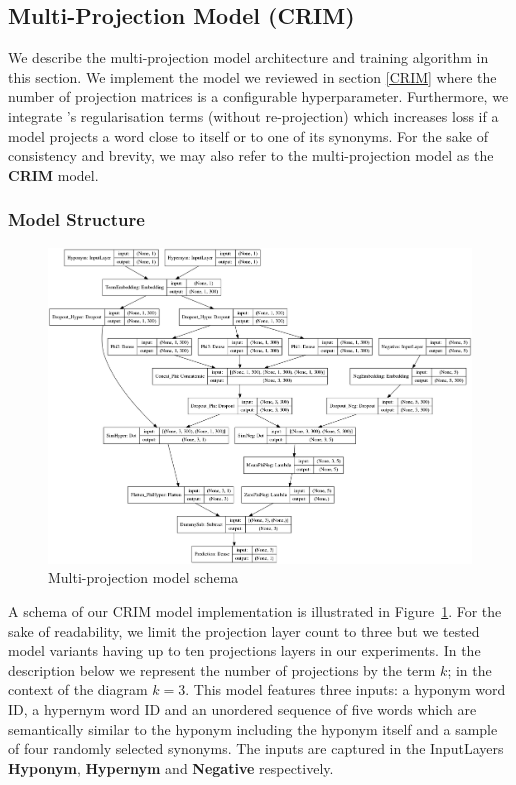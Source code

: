 \subsection{Multi-Projection Model (CRIM)} \label{multi-proj-model}
We describe the multi-projection model architecture and training algorithm in this section.  We implement the model we reviewed in section \ref{CRIM} where the number of projection matrices is a configurable hyperparameter.  Furthermore, we integrate \citep{ustalov2017negative}'s regularisation terms (without re-projection) which increases loss if a model projects a word close to itself or to one of its synonyms.  For the sake of consistency and brevity, we  may also refer to the multi-projection model as the \textbf{CRIM} model.

\subsubsection{Model Structure} \label{crim_model_structure}
\begin{figure}[ht!] 
  \centering
  \includegraphics[width=1.\linewidth]{images/CRIM_multiphi_regularised.png}
  \caption{Multi-projection model schema}
  \label{fig:multiphi_model}
\end{figure}
A schema of our CRIM model implementation is illustrated in Figure~\ref{fig:multiphi_model}.  For the sake of readability, we limit the projection layer count to three but we tested model variants having up to ten projections layers in our experiments.  In the description below we represent the number of projections by the term $k$; in the context of the diagram $k=3$.  This model features three inputs: a hyponym word ID, a hypernym word ID and an unordered sequence of five words which are semantically similar to the hyponym including the hyponym itself and a sample of four randomly selected synonyms.  The inputs are captured in the InputLayers \textbf{Hyponym}, \textbf{Hypernym} and \textbf{Negative} respectively.

